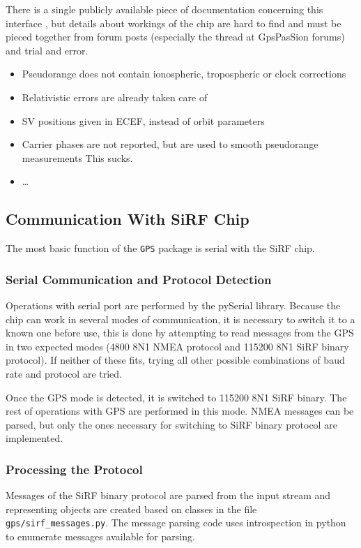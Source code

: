There is a single publicly available piece of documentation concerning this
interface \cite{sirf-protocol}, but details about workings of the chip are hard
to find and must be pieced together from forum posts (especially the thread
\cite{gpspassion-sirf} at GpsPasSion forums) and trial and error.


\begin{itemize}
\item Pseudorange does not contain ionospheric, tropospheric or clock corrections
\item Relativistic errors are already taken care of 
\item SV positions given in ECEF, instead of orbit parameters
\item Carrier phases are not reported, but are used to smooth pseudorange measurements
    This sucks.
\item \ldots
\end{itemize}

\subsection{Communication With SiRF Chip}
The most basic function of the \verb=GPS= package is serial with the
SiRF chip.

\subsubsection{Serial Communication and Protocol Detection}
Operations with serial port are performed by the pySerial library.
Because the chip can work in several modes of communication, it is necessary to
switch it to a known one before use, this is done by attempting to read messages
from the GPS in two expected modes (4800 8N1 NMEA protocol and 115200 8N1 SiRF
binary protocol). If neither of these fits, trying all other possible
combinations of baud rate and protocol are tried.

Once the GPS mode is detected, it is switched to 115200 8N1 SiRF binary.
The rest of operations with GPS are performed in this mode.
NMEA messages can be parsed, but only the ones necessary for switching to
SiRF binary protocol are implemented.

\subsubsection{Processing the Protocol}
Messages of the SiRF binary protocol are parsed from the input stream and
representing objects are created based on classes in the file \verb=gps/sirf_messages.py=.
The message parsing code uses introspection in python to enumerate messages
available for parsing.

